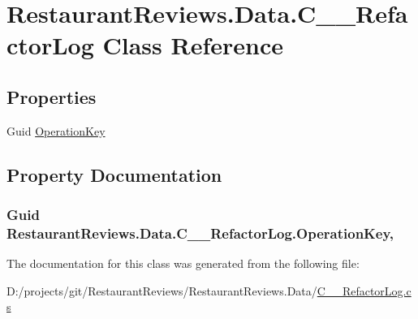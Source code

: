 \hypertarget{class_restaurant_reviews_1_1_data_1_1_c_____refactor_log}{}\section{Restaurant\+Reviews.\+Data.\+C\+\_\+\+\_\+\+Refactor\+Log Class Reference}
\label{class_restaurant_reviews_1_1_data_1_1_c_____refactor_log}
\subsection*{Properties}
\begin{DoxyCompactItemize}
\item 
Guid \hyperlink{class_restaurant_reviews_1_1_data_1_1_c_____refactor_log_a56eee7c1255448f4a26444cbf34ad4de}{Operation\+Key}
\end{DoxyCompactItemize}


\subsection{Property Documentation}
\subsubsection[{\texorpdfstring{Operation\+Key}{OperationKey}}]{\setlength{\rightskip}{0pt plus 5cm}Guid Restaurant\+Reviews.\+Data.\+C\+\_\+\+\_\+\+Refactor\+Log.\+Operation\+Key\hspace{0.3cm}{\ttfamily [get]}, {\ttfamily [set]}}\hypertarget{class_restaurant_reviews_1_1_data_1_1_c_____refactor_log_a56eee7c1255448f4a26444cbf34ad4de}{}\label{class_restaurant_reviews_1_1_data_1_1_c_____refactor_log_a56eee7c1255448f4a26444cbf34ad4de}


The documentation for this class was generated from the following file\+:\begin{DoxyCompactItemize}
\item 
D\+:/projects/git/\+Restaurant\+Reviews/\+Restaurant\+Reviews.\+Data/\hyperlink{_c_____refactor_log_8cs}{C\+\_\+\+\_\+\+Refactor\+Log.\+cs}\end{DoxyCompactItemize}
